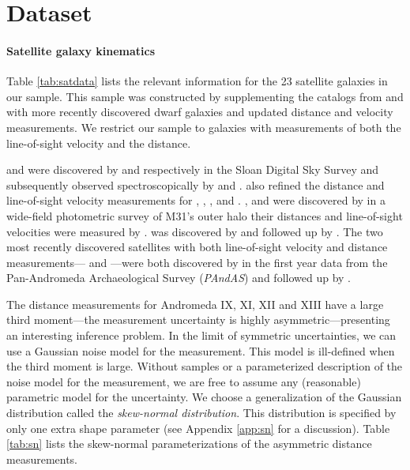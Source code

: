 \documentclass[preprint,12pt]{aastex}
\newcommand{\project}[1]{\emph{#1}}
\newcommand{\sdss}{\project{SDSS}}
\newcommand{\pandas}{\project{PAndAS}}
\newcommand{\Tab}[1]{Table \ref{tab:#1}}
\newcommand{\app}[1]{Appendix \ref{app:#1}}
\begin{document}
\section{Dataset}

\paragraph{Satellite galaxy kinematics}

\Tab{satdata} lists the relevant information for the 23 satellite
galaxies in our sample.  This sample was constructed by supplementing the
catalogs from \citet{Evans:2000a} and \cite{McConnachie:2006} with more
recently discovered dwarf galaxies and updated distance and velocity
measurements. We restrict our sample to galaxies with measurements of both
the line-of-sight velocity and the distance.

 and  were discovered by
\citet{Zucker:2004} and \citet{Zucker:2007} respectively in the Sloan Digital
Sky Survey \citep[\sdss;][]{York:2000} and subsequently observed
spectroscopically by \citet{Collins:2010} and \citet{Kalirai:2010}.
\citet{Kalirai:2010} also refined the distance and line-of-sight velocity
measurements for , ,
,  and .
,  and
 were discovered by \citet{Martin:2006} in a
wide-field photometric survey of M31's outer halo their distances and
line-of-sight velocities were measured by \citet{Collins:2010}.
 was discovered by \citet{Majewski:2007} and
followed up by \citet{Kalirai:2010}.  The two most recently discovered
satellites with both line-of-sight velocity and distance measurements---%
 and ---were
both discovered by \citet{Ibata:2007} in the first year data from the
Pan-Andromeda Archaeological Survey (\pandas) and followed up by
\citet{Letarte:2009}.

The distance measurements for Andromeda IX, XI, XII and XIII have a large
third moment---the measurement uncertainty is highly
asymmetric---presenting an interesting inference problem. In the limit of
symmetric uncertainties, we can use a Gaussian noise model for the
measurement. This model is ill-defined when the third moment is large.
Without samples or a parameterized description of the noise model for the
measurement, we are free to assume any (reasonable) parametric model for
the uncertainty. We choose a generalization of the Gaussian distribution
called the \emph{skew-normal distribution}. This distribution is
specified by only one extra shape parameter (see \app{sn} for a
discussion).  \Tab{sn} lists the skew-normal parameterizations of the
asymmetric distance measurements.
\end{document}
